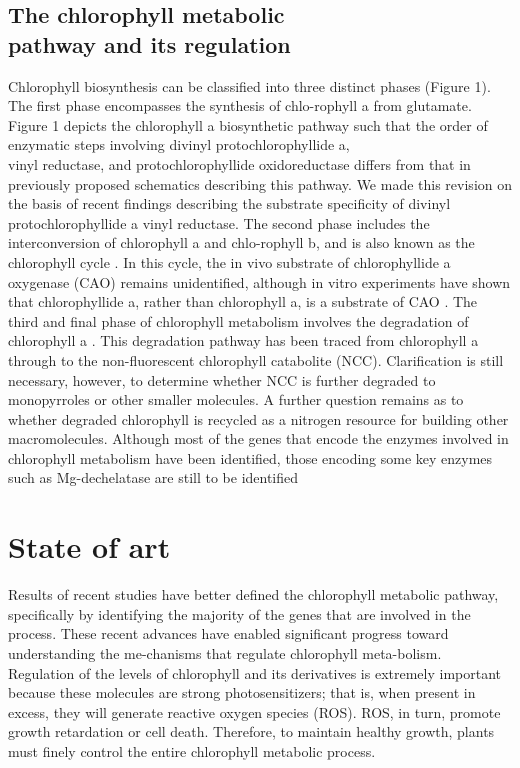 \documentclass[a4paper, 11pt]{article}
\begin{document}
	\subsection{The chlorophyll metabolic\\ pathway and its regulation} 
	Chlorophyll biosynthesis can be classified into three distinct phases (Figure 1). The first phase encompasses the synthesis of chlo-rophyll a from glutamate. Figure 1 depicts the chlorophyll a biosynthetic pathway such that the order of enzymatic steps involving divinyl protochlorophyllide a, \\vinyl reductase, and protochlorophyllide oxidoreductase differs from that in previously proposed schematics describing this pathway. We made this revision on the basis of recent findings describing the substrate specificity of divinyl protochlorophyllide a vinyl reductase. The second phase includes the interconversion of chlorophyll a and chlo-rophyll b, and is also known as the chlorophyll cycle \cite{Rudiger2002}. In this cycle, the in vivo substrate of chlorophyllide a oxygenase (CAO) remains unidentified, although in vitro experiments have shown that chlorophyllide a, rather than chlorophyll a, is a substrate of CAO \cite{Oster2000}. The third and final phase of chlorophyll metabolism involves the degradation of chlorophyll a \cite{Takamiya2000}. This degradation pathway has been traced from chlorophyll a through to the non-fluorescent chlorophyll catabolite (NCC). Clarification is still necessary, however, to determine whether NCC is further degraded to monopyrroles or other smaller molecules. A further question remains as to whether degraded chlorophyll is recycled as a nitrogen resource for building other macromolecules. Although most of the genes that encode the enzymes involved in chlorophyll metabolism have been identified, those encoding some key enzymes such as Mg-dechelatase are still to be identified \cite{Tanaka2006}

	\twocolumn
\section{State of art}
	Results of recent studies have better defined the chlorophyll metabolic pathway,\\ specifically by identifying the majority of the genes that are involved in the process. These recent advances have enabled significant progress toward understanding the me-chanisms that regulate chlorophyll meta-bolism. Regulation of the levels of chlorophyll and its derivatives is extremely important because these molecules are strong photosensitizers; that is, when present in excess, they will generate reactive oxygen species (ROS). ROS, in turn, promote\\ growth retardation or cell death. Therefore, to maintain healthy growth, plants must finely control the entire chlorophyll metabolic process.\\
	
\end{document}
